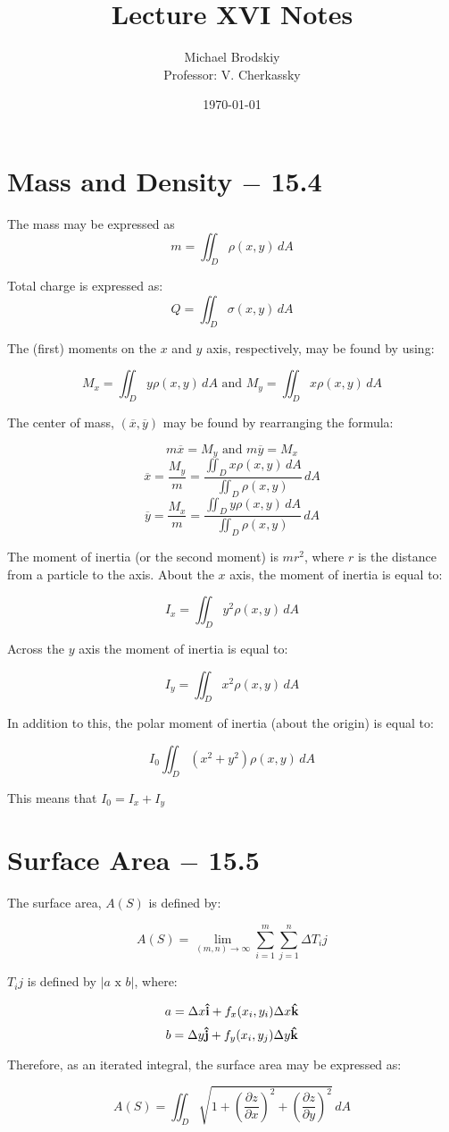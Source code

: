 \documentclass[12pt]{article}
\title{Lecture XVI Notes}
\date{\today}
\author{Michael Brodskiy\\ \small Professor: V. Cherkassky}
\begin{document}
\maketitle

\section{Mass and Density $-$ 15.4}

The mass may be expressed as 
$$m=\iint_D \rho(x,y)\,dA$$

Total charge is expressed as:
$$Q=\iint_D \sigma(x,y)\,dA$$

The (first) moments on the $x$ and $y$ axis, respectively, may be found by using:

$$M_x=\iint_D y\rho(x,y)\,dA\text{ and }M_y=\iint_D x\rho(x,y)\,dA$$

The center of mass, $(\overline{x},\overline{y})$ may be found by rearranging the formula:

$$m\overline{x}=M_y\text{ and } m\overline{y}=M_x$$
$$\overline{x}=\frac{M_y}{m}=\frac{\iint_D x\rho(x,y)\,dA}{\iint_D \rho(x,y)}\,dA$$
  $$\overline{y}=\frac{M_x}{m}=\frac{\iint_D y\rho(x,y)\,dA}{\iint_D \rho(x,y)}\,dA$$

  The moment of inertia (or the second moment) is $mr^2$, where $r$ is the distance from a particle to the axis. About the $x$ axis, the moment of inertia is equal to:

  $$I_x = \iint_D y^2\rho(x,y)\,dA$$

  Across the $y$ axis the moment of inertia is equal to:

  $$I_y=\iint_D x^2\rho(x,y)\,dA$$

  In addition to this, the polar moment of inertia (about the origin) is equal to:

  $$I_0\iint_D (x^2+y^2)\rho(x,y)\,dA$$

  This means that $I_0=I_x+I_y$

  \section{Surface Area $-$ 15.5}

  The surface area, $A(S)$ is defined by:

  $$A(S)=\lim_{(m,n)\to\infty}\sum_{i=1}^m\sum_{j=1}^n \Delta T_ij$$

  $T_ij$ is defined by $|a\text{ x }b|$, where:

  $$a=\Delta x\bold{\hat{i}} + f_x(x_i,y_i)\Delta x \bold{\hat{k}}$$
  $$b=\Delta y\bold{\hat{j}} + f_y(x_i,y_j)\Delta y \bold{\hat{k}}$$

  Therefore, as an iterated integral, the surface area may be expressed as:

  $$A(S)=\iint_D \sqrt{1+\left(\frac{\partial z}{\partial x}\right)^2+\left(\frac{\partial z}{\partial y}\right)^2}\,dA$$
\end{document}
